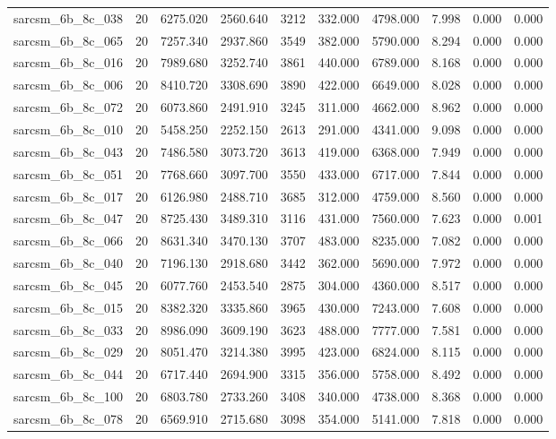 \begin{tabular}{lrrrrrrrrr}
sarcsm\_6b\_8c\_038 & 20 & 6275.020 & 2560.640 & 3212 & 332.000 & 4798.000 & 7.998 & 0.000 & 0.000 \\
sarcsm\_6b\_8c\_065 & 20 & 7257.340 & 2937.860 & 3549 & 382.000 & 5790.000 & 8.294 & 0.000 & 0.000 \\
sarcsm\_6b\_8c\_016 & 20 & 7989.680 & 3252.740 & 3861 & 440.000 & 6789.000 & 8.168 & 0.000 & 0.000 \\
sarcsm\_6b\_8c\_006 & 20 & 8410.720 & 3308.690 & 3890 & 422.000 & 6649.000 & 8.028 & 0.000 & 0.000 \\
sarcsm\_6b\_8c\_072 & 20 & 6073.860 & 2491.910 & 3245 & 311.000 & 4662.000 & 8.962 & 0.000 & 0.000 \\
sarcsm\_6b\_8c\_010 & 20 & 5458.250 & 2252.150 & 2613 & 291.000 & 4341.000 & 9.098 & 0.000 & 0.000 \\
sarcsm\_6b\_8c\_043 & 20 & 7486.580 & 3073.720 & 3613 & 419.000 & 6368.000 & 7.949 & 0.000 & 0.000 \\
sarcsm\_6b\_8c\_051 & 20 & 7768.660 & 3097.700 & 3550 & 433.000 & 6717.000 & 7.844 & 0.000 & 0.000 \\
sarcsm\_6b\_8c\_017 & 20 & 6126.980 & 2488.710 & 3685 & 312.000 & 4759.000 & 8.560 & 0.000 & 0.000 \\
sarcsm\_6b\_8c\_047 & 20 & 8725.430 & 3489.310 & 3116 & 431.000 & 7560.000 & 7.623 & 0.000 & 0.001 \\
sarcsm\_6b\_8c\_066 & 20 & 8631.340 & 3470.130 & 3707 & 483.000 & 8235.000 & 7.082 & 0.000 & 0.000 \\
sarcsm\_6b\_8c\_040 & 20 & 7196.130 & 2918.680 & 3442 & 362.000 & 5690.000 & 7.972 & 0.000 & 0.000 \\
sarcsm\_6b\_8c\_045 & 20 & 6077.760 & 2453.540 & 2875 & 304.000 & 4360.000 & 8.517 & 0.000 & 0.000 \\
sarcsm\_6b\_8c\_015 & 20 & 8382.320 & 3335.860 & 3965 & 430.000 & 7243.000 & 7.608 & 0.000 & 0.000 \\
sarcsm\_6b\_8c\_033 & 20 & 8986.090 & 3609.190 & 3623 & 488.000 & 7777.000 & 7.581 & 0.000 & 0.000 \\
sarcsm\_6b\_8c\_029 & 20 & 8051.470 & 3214.380 & 3995 & 423.000 & 6824.000 & 8.115 & 0.000 & 0.000 \\
sarcsm\_6b\_8c\_044 & 20 & 6717.440 & 2694.900 & 3315 & 356.000 & 5758.000 & 8.492 & 0.000 & 0.000 \\
sarcsm\_6b\_8c\_100 & 20 & 6803.780 & 2733.260 & 3408 & 340.000 & 4738.000 & 8.368 & 0.000 & 0.000 \\
sarcsm\_6b\_8c\_078 & 20 & 6569.910 & 2715.680 & 3098 & 354.000 & 5141.000 & 7.818 & 0.000 & 0.000 \\

\end{tabular}

